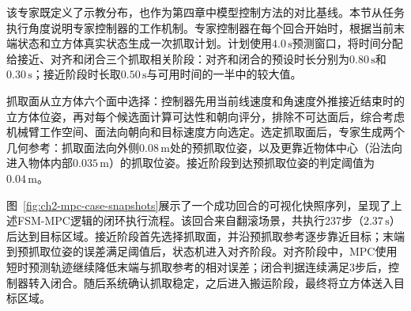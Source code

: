 该专家既定义了示教分布，也作为第四章中模型控制方法的对比基线。本节从任务执行角度说明专家控制器的工作机制。专家控制器在每个回合开始时，根据当前末端状态和立方体真实状态生成一次抓取计划。计划使用$4.0\,\mathrm{s}$预测窗口，将时间分配给接近、对齐和闭合三个抓取相关阶段：对齐和闭合的预设时长分别为$0.80\,\mathrm{s}$和$0.30\,\mathrm{s}$；接近阶段时长取$0.50\,\mathrm{s}$与可用时间的一半中的较大值。

抓取面从立方体六个面中选择：控制器先用当前线速度和角速度外推接近结束时的立方体位姿，再对每个候选面计算可达性和朝向评分，排除不可达面后，综合考虑机械臂工作空间、面法向朝向和目标速度方向选定。选定抓取面后，专家生成两个几何参考：抓取面法向外侧$0.08\,\mathrm{m}$处的预抓取位姿，以及更靠近物体中心（沿法向进入物体内部$0.035\,\mathrm{m}$）的抓取位姿。接近阶段到达预抓取位姿的判定阈值为$0.04\,\mathrm{m}$。

图~\ref{fig:ch2-mpc-case-snapshots}展示了一个成功回合的可视化快照序列，呈现了上述FSM-MPC逻辑的闭环执行流程。该回合来自翻滚场景，共执行237步（$2.37\,\mathrm{s}$）后达到目标区域。接近阶段首先选择抓取面，并沿预抓取参考逐步靠近目标；末端到预抓取位姿的误差满足阈值后，状态机进入对齐阶段。对齐阶段中，MPC使用短时预测轨迹继续降低末端与抓取参考的相对误差；闭合判据连续满足3步后，控制器转入闭合。随后系统确认抓取稳定，之后进入搬运阶段，最终将立方体送入目标区域。

